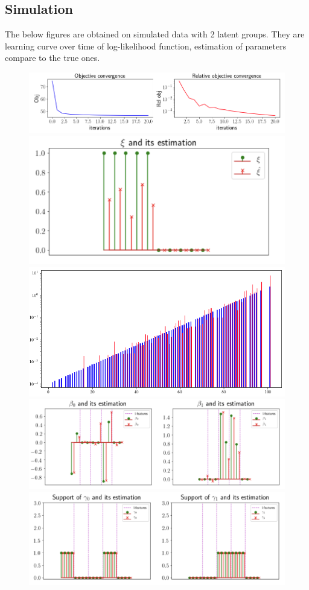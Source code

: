\documentclass[11pt]{article}
\begin{document}
\subsection{Simulation}
The below figures are obtained on simulated data with 2 latent groups. They are  learning curve over time of log-likelihood function, estimation of parameters compare to the true ones.
\begin{figure}[!ht]
\centering
\includegraphics[width=.85\textwidth]{./figures/obj_vcg}
\includegraphics[width=.37\textwidth]{./figures/xi_estimation}
\includegraphics[width=.37\textwidth]{./figures/baseline_estimation}
\includegraphics[width=.8\textwidth]{./figures/beta_estimation}
\includegraphics[width=.8\textwidth]{./figures/gamma_estimation}
\end{figure}

\footnotesize

{}
\end{document}
